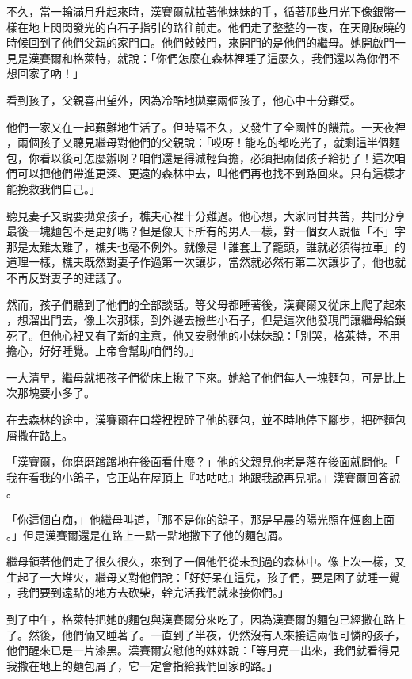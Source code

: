 \documentclass[oneside,10pt]{memoir} %
\begin{document}
不久，當一輪滿月升起來時，漢賽爾就拉著他妹妹的手，循著那些月光下像銀幣一
樣在地上閃閃發光的白石子指引的路往前走。他們走了整整的一夜，在天剛破曉的
時候回到了他們父親的家門口。他們敲敲門，來開門的是他們的繼母。她開啟門一
見是漢賽爾和格萊特，就說：「你們怎麼在森林裡睡了這麼久，我們還以為你們不
想回家了吶！」

看到孩子，父親喜出望外，因為冷酷地拋棄兩個孩子，他心中十分難受。

他們一家又在一起艱難地生活了。但時隔不久，又發生了全國性的饑荒。一天夜裡
，兩個孩子又聽見繼母對他們的父親說：「哎呀！能吃的都吃光了，就剩這半個麵
包，你看以後可怎麼辦啊？咱們還是得減輕負擔，必須把兩個孩子給扔了！這次咱
們可以把他們帶進更深、更遠的森林中去，叫他們再也找不到路回來。只有這樣才
能挽救我們自己。」

聽見妻子又說要拋棄孩子，樵夫心裡十分難過。他心想，大家同甘共苦，共同分享
最後一塊麵包不是更好嗎？但是像天下所有的男人一樣，對一個女人說個「不」字
那是太難太難了，樵夫也毫不例外。就像是「誰套上了籠頭，誰就必須得拉車」的
道理一樣，樵夫既然對妻子作過第一次讓步，當然就必然有第二次讓步了，他也就
不再反對妻子的建議了。

然而，孩子們聽到了他們的全部談話。等父母都睡著後，漢賽爾又從床上爬了起來
，想溜出門去，像上次那樣，到外邊去撿些小石子，但是這次他發現門讓繼母給鎖
死了。但他心裡又有了新的主意，他又安慰他的小妹妹說：「別哭，格萊特，不用
擔心，好好睡覺。上帝會幫助咱們的。」

一大清早，繼母就把孩子們從床上揪了下來。她給了他們每人一塊麵包，可是比上
次那塊要小多了。

在去森林的途中，漢賽爾在口袋裡捏碎了他的麵包，並不時地停下腳步，把碎麵包
屑撒在路上。

「漢賽爾，你磨磨蹭蹭地在後面看什麼？」他的父親見他老是落在後面就問他。「
我在看我的小鴿子，它正站在屋頂上『咕咕咕』地跟我說再見呢。」漢賽爾回答說
。

「你這個白痴，」他繼母叫道，「那不是你的鴿子，那是早晨的陽光照在煙囪上面
。」但是漢賽爾還是在路上一點一點地撒下了他的麵包屑。

繼母領著他們走了很久很久，來到了一個他們從未到過的森林中。像上次一樣，又
生起了一大堆火，繼母又對他們說：「好好呆在這兒，孩子們，要是困了就睡一覺
，我們要到遠點的地方去砍柴，幹完活我們就來接你們。」

到了中午，格萊特把她的麵包與漢賽爾分來吃了，因為漢賽爾的麵包已經撒在路上
了。然後，他們倆又睡著了。一直到了半夜，仍然沒有人來接這兩個可憐的孩子，
他們醒來已是一片漆黑。漢賽爾安慰他的妹妹說：「等月亮一出來，我們就看得見
我撒在地上的麵包屑了，它一定會指給我們回家的路。」
\end{document}
